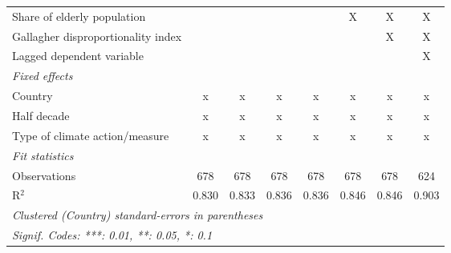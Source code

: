 \begin{tabular}{lccccccc}
   Share of elderly population                                         &                &               &               &               & X              & X              & X\\  
   Gallagher disproportionality index                                  &                &               &               &               &                & X              & X\\  
   Lagged dependent variable                                           &                &               &               &               &                &                & X\\  
   \emph{Fixed effects}\\
   Country                                                             & x              & x             & x             & x             & x              & x              & x\\  
   Half decade                                                         & x              & x             & x             & x             & x              & x              & x\\  
   Type of climate action/measure                                      & x              & x             & x             & x             & x              & x              & x\\  
   \midrule \emph{Fit statistics}\\
   Observations                                                        & 678            & 678           & 678           & 678           & 678            & 678            & 624\\  
   R$^2$                                                               & 0.830          & 0.833         & 0.836         & 0.836         & 0.846          & 0.846          & 0.903\\  
   \midrule
   \multicolumn{8}{l}{\emph{Clustered (Country) standard-errors in parentheses}}\\
   \multicolumn{8}{l}{\emph{Signif. Codes: ***: 0.01, **: 0.05, *: 0.1}}\\
\end{tabular}
\par\endgroup



